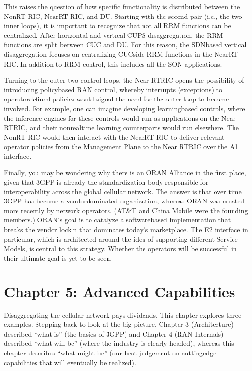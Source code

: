\documentclass[a4paper,11pt,english]{sphinxmanual}
\begin{document}
\sphinxAtStartPar
This raises the question of how specific functionality is distributed
between the Non\sphinxhyphen{}RT RIC, Near\sphinxhyphen{}RT RIC, and DU. Starting with the second
pair (i.e., the two inner loops), it is important to recognize that
not all RRM functions can be centralized. After horizontal and
vertical CUPS disaggregation, the RRM functions are split between CU\sphinxhyphen{}C
and DU. For this reason, the SDN\sphinxhyphen{}based vertical disaggregation focuses
on centralizing CU\sphinxhyphen{}C\sphinxhyphen{}side RRM functions in the Near\sphinxhyphen{}RT RIC. In
addition to RRM control, this includes all the SON applications.

\sphinxAtStartPar
Turning to the outer two control loops, the Near RT\sphinxhyphen{}RIC opens the
possibility of introducing policy\sphinxhyphen{}based RAN control, whereby
interrupts (exceptions) to operator\sphinxhyphen{}defined policies would signal the
need for the outer loop to become involved. For example, one can
imagine developing learning\sphinxhyphen{}based controls, where the inference
engines for these controls would run as applications on the Near
RT\sphinxhyphen{}RIC, and their non\sphinxhyphen{}real\sphinxhyphen{}time learning counterparts would run
elsewhere. The Non\sphinxhyphen{}RT RIC would then interact with the Near\sphinxhyphen{}RT RIC to
deliver relevant operator policies from the Management Plane to the
Near RT\sphinxhyphen{}RIC over the A1 interface.

\sphinxAtStartPar
Finally, you may be wondering why there is an O\sphinxhyphen{}RAN Alliance in the
first place, given that 3GPP is already the standardization body
responsible for interoperability across the global cellular network.
The answer is that over time 3GPP has become a vendor\sphinxhyphen{}dominated
organization, whereas O\sphinxhyphen{}RAN was created more recently by network
operators. (AT\&T and China Mobile were the founding members.) O\sphinxhyphen{}RAN’s
goal is to catalyze a software\sphinxhyphen{}based implementation that breaks the
vendor lock\sphinxhyphen{}in that dominates today’s marketplace. The E2 interface
in particular, which is architected around the idea of supporting
different Service Models, is central to this strategy. Whether the
operators will be successful in their ultimate goal is yet to be seen.


\chapter{Chapter 5:  Advanced Capabilities}
\label{\detokenize{disaggregate:chapter-5-advanced-capabilities}}\label{\detokenize{disaggregate::doc}}
\sphinxAtStartPar
Disaggregating the cellular network pays dividends. This chapter
explores three examples. Stepping back to look at the big picture,
Chapter 3 (Architecture) described “what is” (the basics of 3GPP) and
Chapter 4 (RAN Internals) described “what will be” (where the industry
is clearly headed), whereas this chapter describes “what might be”
(our best judgement on cutting\sphinxhyphen{}edge capabilities that will eventually
be realized).
\end{document}
